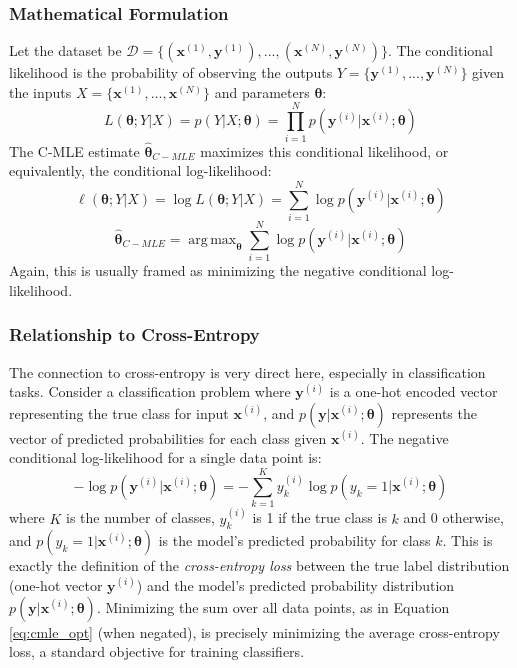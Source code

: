 \documentclass{article}
\DeclareMathOperator*{\argmax}{arg\,max}
\begin{document}
\subsubsection{Mathematical Formulation}
Let the dataset be $\mathcal{D} = \{ (\mathbf{x}^{(1)}, \mathbf{y}^{(1)}), ..., (\mathbf{x}^{(N)}, \mathbf{y}^{(N)}) \}$. The conditional likelihood is the probability of observing the outputs $Y = \{\mathbf{y}^{(1)}, ..., \mathbf{y}^{(N)}\}$ given the inputs $X = \{\mathbf{x}^{(1)}, ..., \mathbf{x}^{(N)}\}$ and parameters $\bm{\theta}$:
\begin{equation}
    L(\bm{\theta}; Y|X) = p(Y | X; \bm{\theta}) = \prod_{i=1}^{N} p(\mathbf{y}^{(i)} | \mathbf{x}^{(i)}; \bm{\theta})
\end{equation}
The C-MLE estimate $\hat{\bm{\theta}}_{C-MLE}$ maximizes this conditional likelihood, or equivalently, the conditional log-likelihood:
\begin{equation}
    \ell(\bm{\theta}; Y|X) = \log L(\bm{\theta}; Y|X) = \sum_{i=1}^{N} \log p(\mathbf{y}^{(i)} | \mathbf{x}^{(i)}; \bm{\theta})
\end{equation}
\begin{equation} \label{eq:cmle_opt}
    \hat{\bm{\theta}}_{C-MLE} = \argmax_{\bm{\theta}} \sum_{i=1}^{N} \log p(\mathbf{y}^{(i)} | \mathbf{x}^{(i)}; \bm{\theta})
\end{equation}
Again, this is usually framed as minimizing the negative conditional log-likelihood.

\subsubsection{Relationship to Cross-Entropy}
The connection to cross-entropy is very direct here, especially in classification tasks. Consider a classification problem where $\mathbf{y}^{(i)}$ is a one-hot encoded vector representing the true class for input $\mathbf{x}^{(i)}$, and $p(\mathbf{y} | \mathbf{x}^{(i)}; \bm{\theta})$ represents the vector of predicted probabilities for each class given $\mathbf{x}^{(i)}$. The negative conditional log-likelihood for a single data point is:
\begin{equation}
    -\log p(\mathbf{y}^{(i)} | \mathbf{x}^{(i)}; \bm{\theta}) = -\sum_{k=1}^{K} y^{(i)}_k \log p(y_k=1 | \mathbf{x}^{(i)}; \bm{\theta})
\end{equation}
where $K$ is the number of classes, $y^{(i)}_k$ is 1 if the true class is $k$ and 0 otherwise, and $p(y_k=1 | \mathbf{x}^{(i)}; \bm{\theta})$ is the model's predicted probability for class $k$. This is exactly the definition of the \emph{cross-entropy loss} between the true label distribution (one-hot vector $\mathbf{y}^{(i)}$) and the model's predicted probability distribution $p(\mathbf{y} | \mathbf{x}^{(i)}; \bm{\theta})$. Minimizing the sum over all data points, as in Equation \ref{eq:cmle_opt} (when negated), is precisely minimizing the average cross-entropy loss, a standard objective for training classifiers.
\end{document}
